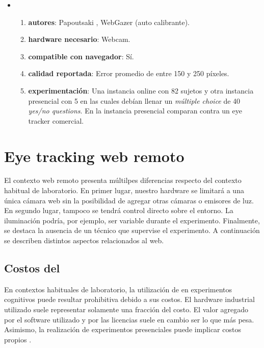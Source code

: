\begin{itemize}
  \item \begin{enumerate}
    \item \textbf{autores}:
      Papoutsaki \etal, WebGazer \cite{papoutsaki_2016_webgazer}
      (\eyetracking auto calibrante).
    \item \textbf{hardware necesario}:
      Webcam.
    \item \textbf{compatible con navegador}:
      Sí.
    \item \textbf{calidad reportada}:
      Error promedio de entre 150 y 250 píxeles.
    \item \textbf{experimentación}:
      Una instancia online con 82 sujetos y otra instancia presencial con 5 en
      las cuales debían llenar un \textit{múltiple choice} de 40
      \textit{yes/no questions}.
      En la instancia presencial comparan contra un eye tracker comercial.
  \end{enumerate}

\end{itemize}

\section{Eye tracking web remoto}

El contexto web remoto presenta múltilpes diferencias respecto del contexto
habitual de laboratorio.
En primer lugar, nuestro hardware se limitará a una única cámara web sin la
posibilidad de agregar otras cámaras o emisores de luz.
En segundo lugar, tampoco se tendrá control directo sobre el entorno.
La iluminación podría, por ejemplo, ser variable durante el experimento.
Finalmente, se destaca la ausencia de un técnico que supervise el experimento.
A continuación se describen distintos aspectos relacionados al \eyetracking web.

\subsection{Costos del \eyetracking}

En contextos habituales de laboratorio, la utilización de \eyetracking en
experimentos cognitivos puede resultar prohibitiva debido a sus costos.
El hardware industrial utilizado suele representar solamente una fracción del
costo.
El valor agregado por el software utilizado y por las licencias suele en cambio
ser lo que más pesa.
Asimismo, la realización de experimentos presenciales puede implicar costos
propios \cite{zandi_2021_pupilext, xu_2015_turker_gaze}.

